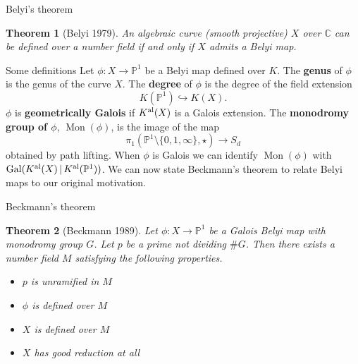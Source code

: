 \documentclass[xcolor=dvipsnames,handout]{beamer}
\theoremstyle{plain}
\newtheorem*{thm}{Theorem}
\newcommand{\PP}{\mathbb P}
\newcommand{\CC}{\mathbb C}
\newcommand{\Kal}{{{K}^{\textup{al}}}}
\DeclareMathOperator{\Mon}{Mon}
\DeclareMathOperator{\Gal}{Gal}
\begin{document}
{\begin{frame}{Belyi's theorem}
      \begin{thm}[Belyi 1979]
        \vspace{1pt}
        An algebraic curve (smooth projective)
        $X$ over $\CC$ can be defined over a number
        field if and only if $X$ admits a
        Belyi map.
      \end{thm}
    \end{frame}
    \begin{frame}{Some definitions}
      Let $\phi\colon X\to\PP^1$ be a Belyi map
      defined over $K$.
      \pause\newline
      The \textbf{genus} of $\phi$ is the genus
      of the curve $X$.
      \pause\newline
      The \textbf{degree} of $\phi$
      is the degree of the field extension
      \[
        K(\PP^1)\hookrightarrow K(X).
      \]
      \pause
      $\phi$ is \textbf{geometrically Galois}
      if $\Kal(X)$ is a Galois extension.
      \pause\newline
      The \textbf{monodromy group of $\phi$},
      $\Mon(\phi)$,
      is the image of the map
      \[
        \pi_1(\PP^1\setminus\{0,1,\infty\},\star)
        \to S_d
      \]
      obtained by path lifting.
      \pause\newline
      When $\phi$ is Galois we
      can identify $\Mon(\phi)$ with
      $\Gal(\Kal(X)\,|\,\Kal(\PP^1))$.
      \pause\newline
      We can now state Beckmann's theorem
      to relate Belyi maps to our original
      motivation.
    \end{frame}
    \begin{frame}{Beckmann's theorem}
      \begin{thm}[Beckmann 1989]
        \vspace{1pt}
        Let $\phi\colon X\to\PP^1$ be a Galois
        Belyi map with monodromy group $G$.
        Let $p$ be a prime not dividing
        $\#G$.
        \pause\newline
        Then there exists a number field $M$
        satisfying the following properties.
        \pause
        \begin{itemize}
          \item
            $p$ is unramified in $M$
          \item
            $\phi$ is defined over $M$
          \item
            $X$ is defined over $M$
          \item
            $X$ has good reduction at all

\end{itemize}
\end{thm}
\end{frame}}
\end{document}
